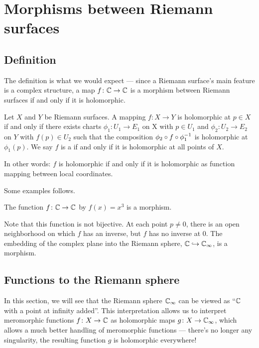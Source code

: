 \chapter{Morphisms between Riemann surfaces}
\label{ch:morphism_riemann}

\section{Definition}

The definition is what we would expect --- since a Riemann surface's main feature is a
complex structure, a map $f \colon \mathbb C \to \mathbb C$ is a morphism between Riemann surfaces
if and only if it is holomorphic.

\begin{definition}
	\label{def:riemann_surface_morphism}
	Let $X$ and $Y$ be Riemann surfaces. A mapping $f \colon X \to Y$ is holomorphic at $p \in X$ if
	and only if there exists charts $\phi_1 \colon U_1 \to E_1$ on X with $p \in U_1$ and $\phi_2
	\colon U_2 \to E_2$ on $Y$ with $f(p) \in U_2$ such that the composition $\phi_2 \circ f \circ
	\phi_1^{-1}$ is holomorphic at $\phi_1(p)$. We say $f$ is a  if and only if it is holomorphic at all points of $X$.
\end{definition}

In other words: $f$ is holomorphic if and only if it is holomorphic as function mapping
between local coordinates.

\begin{example}
	Some examples follows.
	\begin{itemize}
		\ii The function $f \colon \mathbb C \to \mathbb C$ by $f(x) = x^3$ is a morphism.

		Note that this function is not bijective. At each point $p \neq 0$, there is an open
		neighborhood on which $f$ has an inverse, but $f$ has no inverse at $0$.
		\ii The embedding of the complex plane into the Riemann sphere, $\mathbb C \hookrightarrow \mathbb C_\infty$, is
		a morphism.
	\end{itemize}
\end{example}

\section{Functions to the Riemann sphere}

In this section, we will see that the Riemann sphere $\mathbb C_\infty$ can be viewed as ``$\mathbb C$ with a
point at infinity added''. This interpretation allows us to interpret meromorphic functions $f
\colon X \to \mathbb C$ as holomorphic maps $g \colon X \to \mathbb C_\infty$, which allows a much better
handling of meromorphic functions --- there's no longer any singularity, the resulting function
$g$ is holomorphic everywhere!

